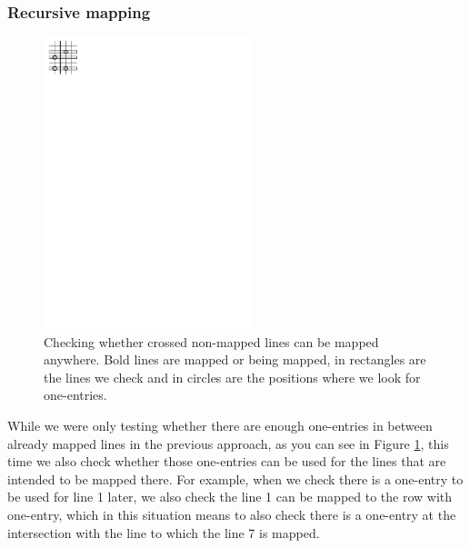 \subsubsection{Recursive mapping}
\begin{figure}[h!]
\centering
\includegraphics[width=60mm]{../img/recursive.pdf}
\caption{Checking whether crossed non-mapped lines can be mapped anywhere. Bold lines are mapped or being mapped, in rectangles are the lines we check and in circles are the positions where we look for one-entries.}
\label{recursive}
\end{figure}
While we were only testing whether there are enough one-entries in between already mapped lines in the previous approach, as you can see in Figure \ref{recursive}, this time we also check whether those one-entries can be used for the lines that are intended to be mapped there. For example, when we check there is a one-entry to be used for line 1 later, we also check the line 1 can be mapped to the row with one-entry, which in this situation means to also check there is a one-entry at the intersection with the line to which the line 7 is mapped.
